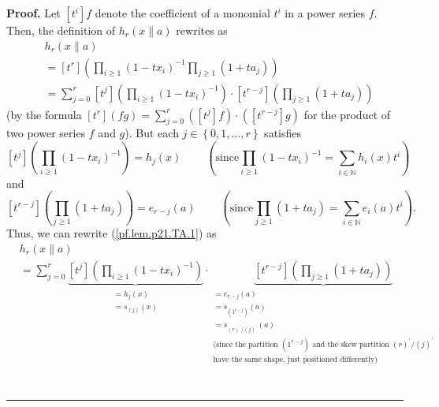 \documentclass[numbers=enddot,12pt,final,onecolumn,notitlepage]{scrartcl}%
\theoremstyle{definition}
\newenvironment{proof}[1][Proof]{\noindent\textbf{#1.} }{\ \rule{0.5em}{0.5em}}
\let\sumnonlimits\sum
\let\prodnonlimits\prod
\renewcommand{\sum}{\sumnonlimits\limits}
\renewcommand{\prod}{\prodnonlimits\limits}
\begin{document}
\begin{enumerate}
\begin{proof}
Let $\left[  t^{i}\right]  f$ denote the coefficient of a monomial $t^{i}$ in
a power series $f$. Then, the definition of $h_{r}\left(  x\parallel a\right)
$ rewrites as%
\begin{align}
&  h_{r}\left(  x\parallel a\right) \nonumber\\
&  =\left[  t^{r}\right]  \left(  \prod_{i\geq1}\left(  1-tx_{i}\right)
^{-1}\prod_{j\geq1}\left(  1+ta_{j}\right)  \right) \nonumber\\
&  =\sum_{j=0}^{r}\left[  t^{j}\right]  \left(  \prod_{i\geq1}\left(
1-tx_{i}\right)  ^{-1}\right)  \cdot\left[  t^{r-j}\right]  \left(
\prod_{j\geq1}\left(  1+ta_{j}\right)  \right)  \label{pf.lem.p21.TA.1}%
\end{align}
(by the formula $\left[  t^{r}\right]  \left(  fg\right)  =\sum_{j=0}%
^{r}\left(  \left[  t^{j}\right]  f\right)  \cdot\left(  \left[
t^{r-j}\right]  g\right)  $ for the product of two power series $f$ and $g$).
But each $j\in\left\{  0,1,\ldots,r\right\}  $ satisfies%
\[
\left[  t^{j}\right]  \left(  \prod_{i\geq1}\left(  1-tx_{i}\right)
^{-1}\right)  =h_{j}\left(  x\right)  \ \ \ \ \ \ \ \ \ \ \left(  \text{since
}\prod_{i\geq1}\left(  1-tx_{i}\right)  ^{-1}=\sum_{i\in\mathbb{N}}%
h_{i}\left(  x\right)  t^{i}\right)
\]
and%
\[
\left[  t^{r-j}\right]  \left(  \prod_{j\geq1}\left(  1+ta_{j}\right)
\right)  =e_{r-j}\left(  a\right)  \ \ \ \ \ \ \ \ \ \ \left(  \text{since
}\prod_{j\geq1}\left(  1+ta_{j}\right)  =\sum_{i\in\mathbb{N}}e_{i}\left(
a\right)  t^{i}\right)  .
\]
Thus, we can rewrite (\ref{pf.lem.p21.TA.1}) as%
\begin{align*}
&  h_{r}\left(  x\parallel a\right) \\
&  =\sum_{j=0}^{r}\underbrace{\left[  t^{j}\right]  \left(  \prod_{i\geq
1}\left(  1-tx_{i}\right)  ^{-1}\right)  }_{\substack{=h_{j}\left(  x\right)
\\=s_{\left(  j\right)  }\left(  x\right)  }}\cdot\underbrace{\left[
t^{r-j}\right]  \left(  \prod_{j\geq1}\left(  1+ta_{j}\right)  \right)
}_{\substack{=e_{r-j}\left(  a\right)  \\=s_{\left(  1^{r-j}\right)  }\left(
a\right)  \\=s_{\left(  r\right)  ^{\prime}/\left(  j\right)  ^{\prime}%
}\left(  a\right)  \\\text{(since the partition }\left(  1^{r-j}\right)
\text{ and the skew partition }\left(  r\right)  ^{\prime}/\left(  j\right)
^{\prime}\\\text{have the same shape, just positioned differently)}}}\\

\end{align*}
\end{proof}
\end{enumerate}
\end{document}
